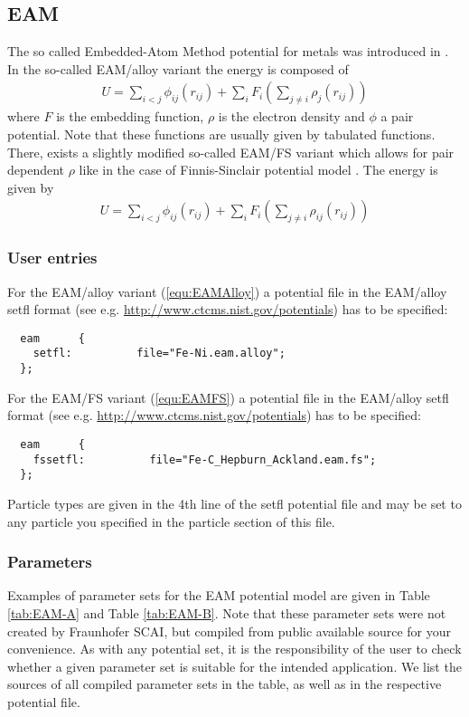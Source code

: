 \subsection{EAM}
\label{potentials:eam}
The so called Embedded-Atom Method potential for metals was introduced in \cite{daw1983semiempirical,daw1984embedded}.
In the  so-called EAM/alloy variant the energy is composed of
\begin{align}\label{equ:EAMAlloy}
  U = \sum_{i<j} \phi_{ij}(r_{ij}) +\sum_i F_i\left(\sum_{j\neq i}\rho_j(r_{ij})\right)
\end{align}
where $F$ is the embedding function, $\rho$ is the electron density
and $\phi$ a pair potential. Note that these functions are usually
given by tabulated functions. There, exists a slightly modified
so-called EAM/FS variant which allows for pair dependent $\rho$ like
in the case of Finnis-Sinclair potential model
\cite{finnis1984simple}. The energy is given by
\begin{align}\label{equ:EAMFS}
  U = \sum_{i<j} \phi_{ij}(r_{ij}) +\sum_i F_i\left(\sum_{j\neq i}\rho_{ij}(r_{ij})\right)
\end{align}

\subsubsection{User entries}
For the EAM/alloy variant (\ref{equ:EAMAlloy}) a potential file in the
EAM/alloy setfl format (see
e.g. \url{http://www.ctcms.nist.gov/potentials}) has to be specified:
\begin{lstlisting}
  eam      {
    setfl:          file="Fe-Ni.eam.alloy";   
  };
\end{lstlisting}
For the EAM/FS variant (\ref{equ:EAMFS}) a potential file in the
EAM/alloy setfl format (see
e.g. \url{http://www.ctcms.nist.gov/potentials}) has to be specified:
\begin{lstlisting}
  eam      {
    fssetfl:          file="Fe-C_Hepburn_Ackland.eam.fs";   
  };
\end{lstlisting}

Particle types are given in the 4th line of the setfl potential file and may be  set to any particle you specified in the
particle section of this file.  

\subsubsection{Parameters}
Examples of parameter sets for the EAM potential model are given in
Table \ref{tab:EAM-A} and Table \ref{tab:EAM-B}. Note that these parameter sets were not created by 
Fraunhofer SCAI, but compiled from public available source for your
convenience. As with any potential set, it is the responsibility of the user to check whether a
given parameter set is suitable for the intended application. We list the
sources of all compiled parameter sets in the table, as well as in the respective 
potential file.

